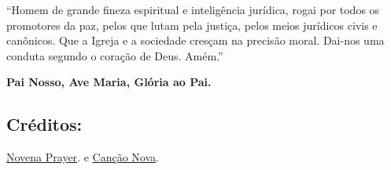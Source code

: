 \documentclass[18pt]{article}
\begin{document}
“Homem de grande fineza espiritual e inteligência jurídica, rogai por todos os promotores da paz, pelos que lutam pela justiça, pelos meios jurídicos civis e canônicos. Que a Igreja e a sociedade cresçam na precisão moral. Dai-nos uma conduta segundo o coração de Deus. Amém.”

\textbf{Pai Nosso, Ave Maria, Glória ao Pai.}

\subsection*{Créditos:}
\href{https://novenaprayer.com/st-raymond-of-penafort-novena/}{Novena Prayer}. e 
\href{https://santo.cancaonova.com/santo/sao-raimundo-de-penafort/}{Canção Nova}.
\end{document}
